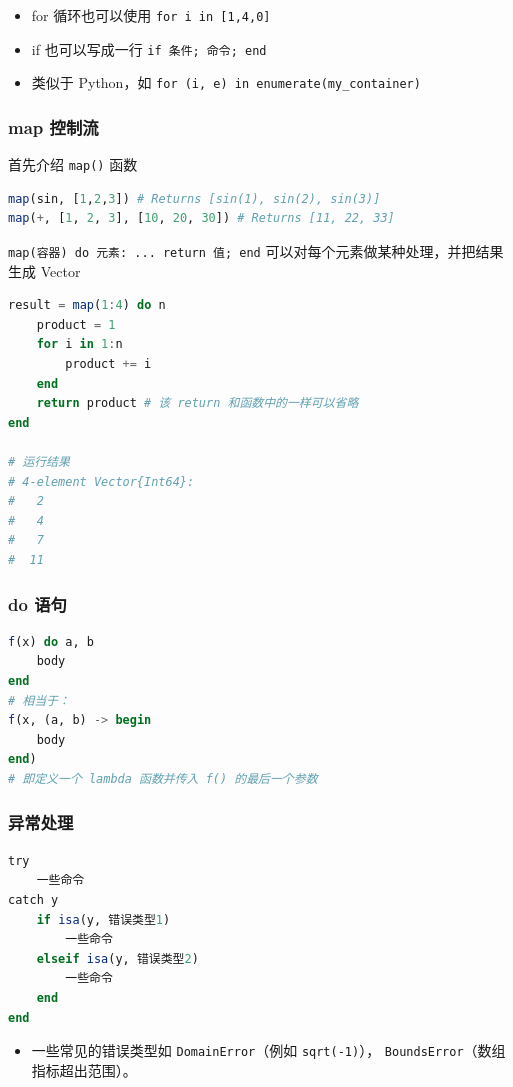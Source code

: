 \begin{itemize}
\item for 循环也可以使用 \verb`for i in [1,4,0]`
\item if 也可以写成一行 \verb`if 条件; 命令; end`
\item 类似于 Python，如 \verb`for (i, e) in enumerate(my_container)`
\end{itemize}

\subsubsection{map 控制流}
首先介绍 \verb`map()` 函数
\begin{lstlisting}[language=julia]
map(sin, [1,2,3]) # Returns [sin(1), sin(2), sin(3)]
map(+, [1, 2, 3], [10, 20, 30]) # Returns [11, 22, 33]
\end{lstlisting}

\verb`map(容器) do 元素: ... return 值; end` 可以对每个元素做某种处理，并把结果生成 Vector
\begin{lstlisting}[language=julia]
result = map(1:4) do n
    product = 1
    for i in 1:n
        product += i
    end
    return product # 该 return 和函数中的一样可以省略
end

# 运行结果
# 4-element Vector{Int64}:
#   2
#   4
#   7
#  11
\end{lstlisting}

\subsubsection{do 语句}
\begin{lstlisting}[language=julia]
f(x) do a, b
    body
end
# 相当于：
f(x, (a, b) -> begin
    body
end)
# 即定义一个 lambda 函数并传入 f() 的最后一个参数
\end{lstlisting}


\subsubsection{异常处理}
\begin{lstlisting}[language=julia]
try 
    一些命令
catch y
    if isa(y, 错误类型1)
        一些命令
    elseif isa(y, 错误类型2)
        一些命令
    end
end
\end{lstlisting}
\begin{itemize}
\item 一些常见的错误类型如 \verb`DomainError`（例如 \verb`sqrt(-1)`）， \verb`BoundsError`（数组指标超出范围）。
\end{itemize}


